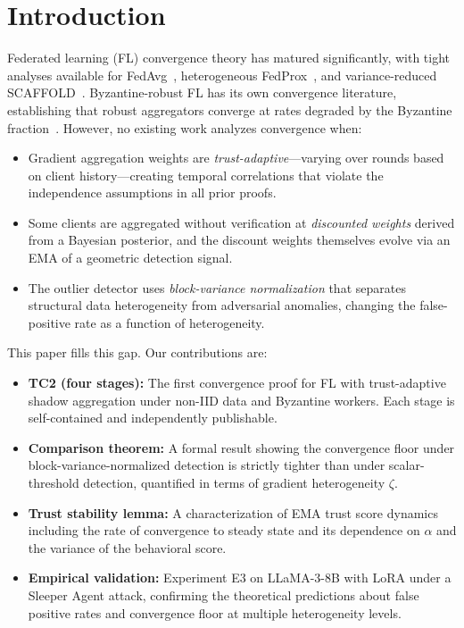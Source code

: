 \documentclass{article}
\begin{document}
\section{Introduction}
\label{sec:intro}

Federated learning (FL) convergence theory has matured significantly, with
tight analyses available for FedAvg~\citep{mcmahan2017communication},
heterogeneous FedProx~\citep{li2020fedprox},
and variance-reduced SCAFFOLD~\citep{karimireddy2020scaffold}.
Byzantine-robust FL has its own convergence literature, establishing that
robust aggregators converge at rates degraded by the Byzantine
fraction~\citep{karimireddy2021byzantinesgd, data2021byzantine}.
However, no existing work analyzes convergence when:

\begin{itemize}
  \item Gradient aggregation weights are \emph{trust-adaptive}---varying
    over rounds based on client history---creating temporal correlations that
    violate the independence assumptions in all prior proofs.
  \item Some clients are aggregated without verification at \emph{discounted
    weights} derived from a Bayesian posterior, and the discount weights
    themselves evolve via an EMA of a geometric detection signal.
  \item The outlier detector uses \emph{block-variance normalization} that
    separates structural data heterogeneity from adversarial anomalies,
    changing the false-positive rate as a function of heterogeneity.
\end{itemize}

This paper fills this gap.
Our contributions are:

\begin{itemize}
  \item \textbf{TC2 (four stages):} The first convergence proof for FL with
    trust-adaptive shadow aggregation under non-IID data and Byzantine workers.
    Each stage is self-contained and independently publishable.
  \item \textbf{Comparison theorem:} A formal result showing the
    convergence floor under block-variance-normalized detection is strictly
    tighter than under scalar-threshold detection, quantified in terms of
    gradient heterogeneity $\zeta$.
  \item \textbf{Trust stability lemma:} A characterization of EMA trust
    score dynamics including the rate of convergence to steady state
    and its dependence on $\alpha$ and the variance of the behavioral score.
  \item \textbf{Empirical validation:} Experiment E3 on LLaMA-3-8B with
    LoRA under a Sleeper Agent attack, confirming the theoretical predictions
    about false positive rates and convergence floor at multiple heterogeneity
    levels.
\end{itemize}
\end{document}
